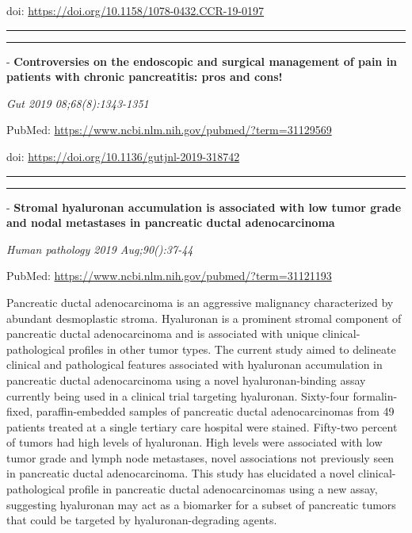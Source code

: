 \documentclass[]{article}
\begin{document}
doi: \url{https://doi.org/10.1158/1078-0432.CCR-19-0197}

{}

{}

\begin{center}\rule{0.5\linewidth}{\linethickness}\end{center}

\begin{center}\rule{0.5\linewidth}{\linethickness}\end{center}

 - \textbf{Controversies on the endoscopic and surgical management of
pain in patients with chronic pancreatitis: pros and cons!}

\emph{Gut 2019 08;68(8):1343-1351}

PubMed: \url{https://www.ncbi.nlm.nih.gov/pubmed/?term=31129569}

doi: \url{https://doi.org/10.1136/gutjnl-2019-318742}

{}

{}

\begin{center}\rule{0.5\linewidth}{\linethickness}\end{center}

\begin{center}\rule{0.5\linewidth}{\linethickness}\end{center}

 - \textbf{Stromal hyaluronan accumulation is associated with low tumor
grade and nodal metastases in pancreatic ductal adenocarcinoma}

\emph{Human pathology 2019 Aug;90():37-44}

PubMed: \url{https://www.ncbi.nlm.nih.gov/pubmed/?term=31121193}

Pancreatic ductal adenocarcinoma is an aggressive malignancy
characterized by abundant desmoplastic stroma. Hyaluronan is a prominent
stromal component of pancreatic ductal adenocarcinoma and is associated
with unique clinical-pathological profiles in other tumor types. The
current study aimed to delineate clinical and pathological features
associated with hyaluronan accumulation in pancreatic ductal
adenocarcinoma using a novel hyaluronan-binding assay currently being
used in a clinical trial targeting hyaluronan. Sixty-four
formalin-fixed, paraffin-embedded samples of pancreatic ductal
adenocarcinomas from 49 patients treated at a single tertiary care
hospital were stained. Fifty-two percent of tumors had high levels of
hyaluronan. High levels were associated with low tumor grade and lymph
node metastases, novel associations not previously seen in pancreatic
ductal adenocarcinoma. This study has elucidated a novel
clinical-pathological profile in pancreatic ductal adenocarcinomas using
a new assay, suggesting hyaluronan may act as a biomarker for a subset
of pancreatic tumors that could be targeted by hyaluronan-degrading
agents.
\end{document}
